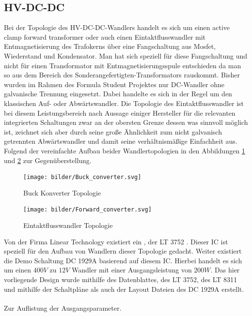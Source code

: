 \FloatBarrier
\subsection{\ac{HV}-DC-DC}
Bei der Topologie des \ac{HV}-DC-DC-Wandlers handelt es sich um einen active clamp forward transformer oder auch einen Eintaktflusswandler mit Entmagnetisierung des Trafokerns über eine Fangschaltung aus Mosfet, Wiederstand und Kondensator. Man hat sich speziell für diese Fangschaltung und nicht für einen Transformator mit Entmagnetisierungsspule entschieden da man so aus dem Bereich des Sonderangefertigten-Transformators rauskommt. Bisher wurden im Rahmen des Formula Student Projektes nur DC-Wandler ohne galvanische Trennung eingesetzt. Dabei handelte es sich in der Regel um den klassischen Auf- oder Abwärtswandler. Die Topologie des Eintaktflusswandler ist bei diesem Leistungsbereich nach Aussage einiger Hersteller für die relevanten integrierten Schaltungen zwar an der obersten Grenze dessen was sinnvoll möglich ist, zeichnet sich aber durch seine große Ähnlichkeit zum nicht galvanisch getrennten Abwärtswandler und damit seine verhältnismäßige Einfachheit aus. Folgend der vereinfachte Aufbau beider Wandlertopologien in den Abbildungen \ref{fig:buckconverter} und \ref{fig:forwardconverter} zur Gegenüberstellung.

\begin{figure}
	\centering
	\texttt{[image: bilder/Buck\_converter.svg]}
	\caption{Buck Konverter Topologie}
	\label{fig:buckconverter}
\end{figure}

\begin{figure}
	\centering
	\texttt{[image: bilder/Forward\_converter.svg]}
	\caption{Eintaktflusswandler Topologie}
	\label{fig:forwardconverter}
\end{figure}

Von der Firma Linear Technology existiert ein , der LT 3752 \cite{LT3752LT3752-1}. Dieser \ac{IC} ist speziell für den Aufbau von Wandlern dieser Topologie gedacht. Weiter existiert die Demo Schaltung DC 1929A \cite{DC1929A} basierend auf diesem \ac{IC}. Hierbei handelt es sich um einen \ensuremath{400 V} zu \ensuremath{12 V} Wandler mit einer Ausgangsleistung von \ensuremath{200 W}. Das hier vorliegende Design wurde mithilfe des Datenblattes, des LT 3752, des LT 8311 \cite{LT8311} und mithilfe der Schaltpläne als auch der Layout Dateien des DC 1929A erstellt.
\\
\\
Zur Auflistung der Ausgangsparameter.

